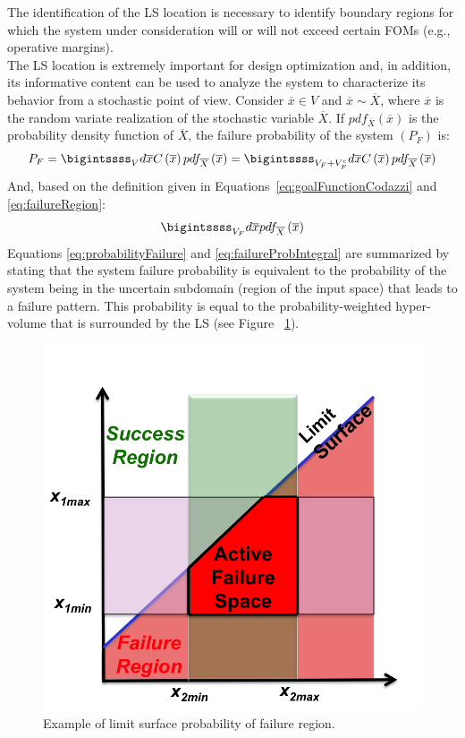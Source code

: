 The identification of the LS location is necessary to identify boundary regions for which the system under consideration will or will not exceed certain FOMs (e.g., operative margins).
\\The LS location is extremely important for design optimization and, in addition, its informative content can be used to analyze the system to characterize its behavior from a stochastic point of view. Consider $\overline{x} \in V$ and $\overline{x}\sim \overline{X}$,
where $\overline{x}$ is the random variate realization of the stochastic variable $\overline{X}$.
If $pdf_{\overline{X}}\left ( \overline{x} \right ) $ is the probability density function of $ \overline{X}$, the failure probability of the system $\left ( P_{F} \right )$ is:
\begin{equation}
\label{eq:probabilityFailure}
P_{F} = \bigintssss_{V}d\overline{x}C\left ( \overline{x} \right )pdf_{\overline{X}}\left ( \overline{x} \right ) = \bigintssss_{V_{F}+V_{F}^{c}}d\overline{x}C\left ( \overline{x} \right )pdf_{\overline{X}}\left ( \overline{x} \right )
\end{equation}
And, based on the definition given in Equations~\ref{eq:goalFunctionCodazzi} and \ref{eq:failureRegion}:
\begin{equation}
 \label{eq:failureProbIntegral}
 \bigintssss_{V_{F}}d\overline{x}pdf_{\overline{X}}\left ( \overline{x} \right ) 
 \end{equation}
Equations \ref{eq:probabilityFailure} and \ref{eq:failureProbIntegral} are summarized by stating that the system failure probability is 
equivalent to the probability of the system being in the uncertain 
subdomain (region of the input space) that leads to a failure pattern. 
This probability is equal to the probability-weighted hyper-volume that is surrounded by the LS (see Figure ~\ref{fig:ProbabilityFailureLSExample}).
\begin{figure}[h!]
  \centering
  \includegraphics[width=1.0\textwidth]  {pics/ProbabilityFailureLSExample.png}
  \caption{Example of limit surface probability of failure region.}
  \label{fig:ProbabilityFailureLSExample}
\end{figure}
